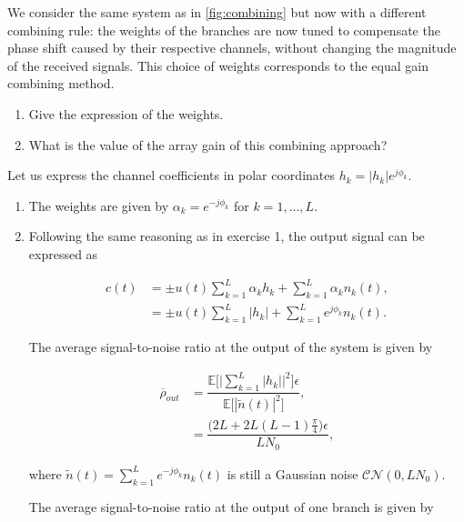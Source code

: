 \documentclass [a4paper, 11pt] {article}
\begin{document}
    \begin{exercise}{2}
    We consider the same system as in \autoref{fig:combining} but now with a different combining rule: the weights of the branches are now tuned to compensate the phase shift caused by their respective channels, without changing the magnitude of the received signals. This choice of weights corresponds to the equal gain combining method.
\begin{enumerate}
\item Give the expression of the weights.
\item What is the value of the array gain of this combining approach?
\end{enumerate}
    \end{exercise}
    
    \begin{solution}
  
              Let us express the channel coefficients in polar coordinates $h_k = |h_k|e^{j\phi_k}$.

\begin{enumerate}
    \item The weights are given by $\alpha_k = e^{-j\phi_k}$ for $k=1,\hdots,L$.
    \item Following the same reasoning as in exercise 1, the output signal can be expressed as 
    
    \begin{align}
        c(t) &= \pm u(t) \sum_{k=1}^{L}\alpha_kh_k + \sum_{k=1}^{L}\alpha_k n_k(t), \\
        &= \pm u(t) \sum_{k=1}^{L} |h_k| + \sum_{k=1}^{L} e^{j\phi_k} n_k(t).
    \end{align}
    
    The average signal-to-noise ratio at the output of the system is given by 
    
    \begin{align}
        \overline{\rho}_{out} &= \dfrac{\mathbb{E}\bigg[ \Big| \sum_{k=1}^{L} |h_k| \Big|^2 \bigg] \epsilon}{\mathbb{E}\Big[ |\tilde{n}(t)|^2\Big]},\\
        &= \dfrac{\Big(2L+2L(L-1)\frac{\pi}{4}\Big) \epsilon}{LN_0},
    \end{align}
    
    where $\tilde{n}(t) = \sum_{k=1}^{L} e^{-j\phi_k}n_k(t)$ is still a Gaussian noise $\mathcal{C}\mathcal{N}(0,LN_0)$.
    
    The average signal-to-noise ratio at the output of one branch is given by 
    

\end{enumerate}
\end{solution}
\end{document}
